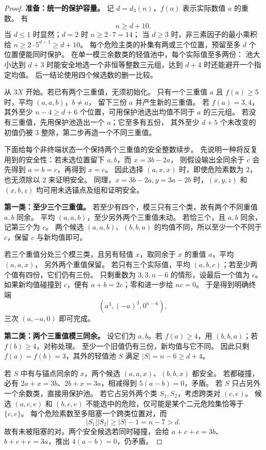 \documentclass[11pt,a4paper,oneside,openany]{book}
\theoremstyle{definition}
\numberwithin{equation}{chapter}
\begin{document}
\begin{proof}
\par\noindent\textbf{准备：统一的保护容量。}
记 $d=d_3(n)$，$f(a)$ 表示实际数值 $a$ 的重数。
有
\[
n\ge d+10.
\]
当 $d\le1$ 时显然；$d=2$ 时 $n\ge2\cdot7=14$；
当 $d\ge3$ 时，非三素因子的最小乘积给 $n\ge2\cdot5^{d-1}\ge d+10$。
每个危险主类的补集有两或三个位置，预留至多 $d$ 个位置便能同时保护。
在单一模三余数类的轻值池中，每个实际值至多两份：
池大小达到 $d+3$ 时能安全地选一个非恒等整数三元组，达到 $d+4$ 时还能避开一个指定均值。
后一结论使用四个候选数的删一比较。

从 $3X$ 开始。若已有两个三重值，无须初始化。
只有一个三重值 $a$ 且 $f(a)\ge5$ 时，平均 $(a,a,b)$，$b\ne a$，
留下三份 $a$ 并产生新的三重值。
若 $f(a)=3,4$，其外至少 $n-4\ge d+6$ 个位置，可用保护池选出均值不同于 $a$ 的三元组。
若没有三重值，先用保护池造出一个 $a$；它至多有五份，
其外至少 $d+5$ 个未改变的初值仍被 $3$ 整除，第二步再造一个不同三重值。

下面给每个非终端状态一个保持两个三重值的安全整数续步。
先说明一种将反复用到的安全性：若未选位置留下 $a,b$，而 $x=3b-2a$，
则假设输出全同余于 $c$ 会先得到 $a=b=c$，再得到 $x=c$。
因此选择 $(a,x,x)$ 时，即使危险素数为 $2$，也无须除以 $2$ 来证明安全。
同理，$x=3b-2a,y=3a-2b$ 时，$(x,y,z)$ 和 $(x,b,z)$ 均可用未选锚点及组和证明安全。

\par\noindent\textbf{第一类：至少三个三重值。}
若至少有四个，模三只有三个类，故有两个不同重值 $a,b$ 同余。
平均 $(a,a,b)$，至少另外两个三重值未动。
若恰三个，且 $a,b$ 同余，记第三个为 $c$。
两个候选 $(a,a,b)$、$(b,b,a)$ 的均值不同，所以至少一个不同于 $c$，保留 $c$ 与新均值即可。

若三个重值分处三个模三类，且另有轻值 $x$，取同余于 $x$ 的重值 $a$，平均 $(a,a,x)$，
另外两个重值保留。
若只有三个实际值，平均 $(a,b,c)$；若至少两个值有四份，它们仍有三份。
只剩重数为 $3,3,n-6$ 的情形，设最后一个值为 $c$。
如果新均值碰撞到 $c$，便有 $a+b=2c$；零和进一步给 $nc=0$。
于是得到明确终端
\[
(a^3,(-a)^3,0^{n-6}),
\]
三次 $(a,-a,0)$ 即可完成。

\par\noindent\textbf{第二类：两个三重值模三同余。}
设它们为 $a,b$。若 $f(a)\ge4$，用 $(b,b,a)$；若 $f(b)\ge4$，对称处理。
至少一个旧值仍有三份，新均值与它不同。
因此只剩 $f(a)=f(b)=3$，其外的轻值池 $S$ 满足 $|S|=n-6\ge d+4$。

若 $S$ 中有与锚点同余的 $x$，两个候选 $(a,a,x)$、$(b,b,x)$ 都安全。
若都碰撞，必有 $2a+x=3b$、$2b+x=3a$，相减得到 $5(a-b)=0$，矛盾。
若 $S$ 只占另外一个余数类，直接用保护池。
若它占另外两个类 $S_1,S_2$，考虑跨类对 $(c,e)$。
候选 $(a,c,e)$ 和 $(b,c,e)$ 不能选中的危险，仅可能是某个二元危险集恰等于 $\{c,e\}$。
每个危险素数至多阻塞一个跨类位置对，而
\[
|S_1||S_2|\ge |S|-1=n-7>d.
\]
故有未被阻塞的对。两个安全候选若同时碰撞，会给
$a+c+e=3b$、$b+c+e=3a$，推出 $4(a-b)=0$，仍矛盾。


\end{proof}
\end{document}
